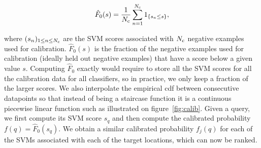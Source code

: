       \begin{equation}
        \hat{F}_0(s)=\frac{1}{N_{\text{c}}} \sum_{n=1}^{N_{\text{c}}} 1_{\{s_n \leq s\}},
        \label{eq:empiricalCDF}
      \end{equation}

      \noindent
      where $(s_n)_{1\leq n \leq N_{\text{c}} }$ are the SVM scores associated with $N_{\text{c}}$ negative examples used for calibration.
      $\hat{F}_0(s)$ is the fraction of the negative examples used for calibration (ideally held out negative examples) that have a score below a given value $s$.
      Computing $\hat{F}_0$ exactly would require to store all the SVM scores for all the calibration data for all classifiers, so in practice, we only keep a fraction of the larger scores.
      We also interpolate the empirical cdf between consecutive datapoints so that instead of being a staircase function it is a continuous piecewise linear function such as illustrated on figure~\ref{fig:calib}. Given a query, we first compute its SVM score $s_q$ and then compute the calibrated probability $f(q)=\hat{F}_0(s_q)$.
      We obtain a similar calibrated probability $f_j(q)$ for each of the SVMs associated with each of the target locations, which can now be ranked.

